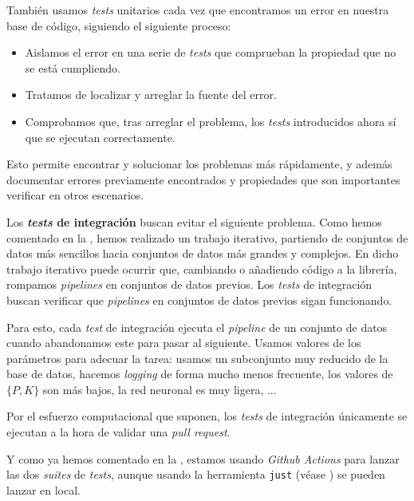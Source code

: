 También usamos \textit{tests} unitarios cada vez que encontramos un error en nuestra base de código, siguiendo el siguiente proceso:

\begin{itemize}
	\item Aislamos el error en una serie de \textit{tests} que comprueban la propiedad que no se está cumpliendo.
	\item Tratamos de localizar y arreglar la fuente del error.
	\item Comprobamos que, tras arreglar el problema, los \textit{tests} introducidos ahora sí que se ejecutan correctamente.
\end{itemize}

Esto permite encontrar y solucionar los problemas más rápidamente, y además documentar errores previamente encontrados y propiedades que son importantes verificar en otros escenarios.

Los \textbf{\textit{tests} de integración} buscan evitar el siguiente problema. Como hemos comentado en la , hemos realizado un trabajo iterativo, partiendo de conjuntos de datos más sencillos hacia conjuntos de datos más grandes y complejos. En dicho trabajo iterativo puede ocurrir que, cambiando o añadiendo código a la librería, rompamos \textit{pipelines} en conjuntos de datos previos. Los \textit{tests} de integración buscan verificar que \textit{pipelines} en conjuntos de datos previos sigan funcionando.

Para esto, cada \textit{test} de integración ejecuta el \textit{pipeline} de un conjunto de datos cuando abandonamos este para pasar al siguiente. Usamos valores de los parámetros para adecuar la tarea: usamos un subconjunto muy reducido de la base de datos, hacemos \textit{logging} de forma mucho menos frecuente, los valores de $\{P, K\}$ son más bajos, la red neuronal es muy ligera, ...

Por el esfuerzo computacional que suponen, los \textit{tests} de integración únicamente se ejecutan a la hora de validar una \textit{pull request}.

Y como ya hemos comentado en la , estamos usando \textit{Github Actions} para lanzar las dos \textit{suites} de \textit{tests}, aunque usando la herramienta \lstinline{just} (véase ) se pueden lanzar en local.
